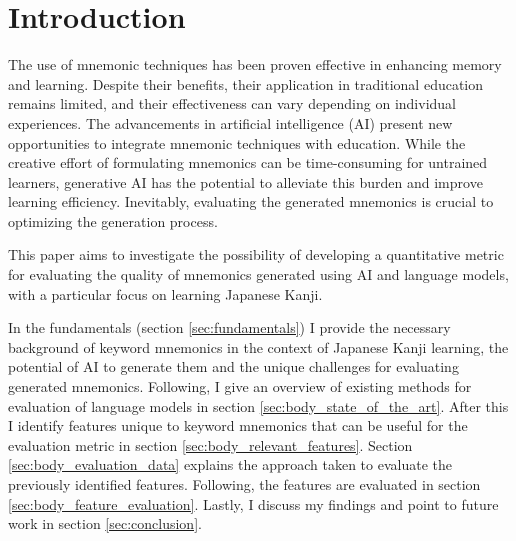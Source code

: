 \section{Introduction} \label{sec:body_motivation}

The use of mnemonic techniques has been proven effective in enhancing memory and learning. Despite their benefits, their application in traditional education remains limited, and their effectiveness can vary depending on individual experiences. The advancements in artificial intelligence (AI) present new opportunities to integrate mnemonic techniques with education. While the creative effort of formulating mnemonics can be time-consuming for untrained learners, generative AI has the potential to alleviate this burden and improve learning efficiency. Inevitably, evaluating the generated mnemonics is crucial to optimizing the generation process.

This paper aims to investigate the possibility of developing a quantitative metric for evaluating the quality of mnemonics generated using AI and language models, with a particular focus on learning Japanese Kanji.

In the fundamentals (section \ref{sec:fundamentals}) I provide the necessary background of keyword mnemonics in the context of Japanese Kanji learning, the potential of AI to generate them and the unique challenges for evaluating generated mnemonics. Following, I give an overview of existing methods for evaluation of language models in section \ref{sec:body_state_of_the_art}. After this I identify features unique to keyword mnemonics that can be useful for the evaluation metric in section \ref{sec:body_relevant_features}. Section \ref{sec:body_evaluation_data} explains the approach taken to evaluate the previously identified features. Following, the features are evaluated in section \ref{sec:body_feature_evaluation}. Lastly, I discuss my findings and point to future work in section \ref{sec:conclusion}.
